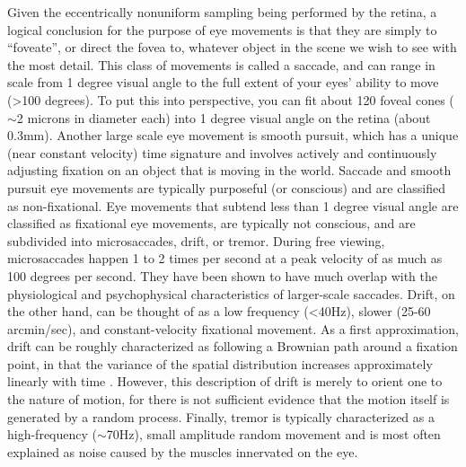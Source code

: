 Given the eccentrically nonuniform sampling being performed by the retina, a logical conclusion for the purpose of eye movements is that they are simply to ``foveate'', or direct the fovea to, whatever object in the scene we wish to see with the most detail.
This class of movements is called a saccade, and can range in scale from 1 degree visual angle to the full extent of your eyes’ ability to move (\textgreater 100 degrees).
To put this into perspective, you can fit about 120 foveal cones ($\sim$2 microns in diameter each) into 1 degree visual angle on the retina (about 0.3mm).
Another large scale eye movement is smooth pursuit, which has a unique (near constant velocity) time signature and involves actively and continuously adjusting fixation on an object that is moving in the world.
Saccade and smooth pursuit eye movements are typically purposeful (or conscious) and are classified as non-fixational.
Eye movements that subtend less than 1 degree visual angle are classified as fixational eye movements, are typically not conscious, and are subdivided into microsaccades, drift, or tremor.
During free viewing, microsaccades happen 1 to 2 times per second at a peak velocity of as much as 100 degrees per second.
They have been shown to have much overlap with the physiological and psychophysical characteristics of larger-scale saccades.
Drift, on the other hand, can be thought of as a low frequency (\textless 40Hz), slower (25-60 arcmin/sec), and constant-velocity fixational movement.
As a first approximation, drift can be roughly characterized as following a Brownian path around a fixation point, in that the variance of the spatial distribution increases approximately linearly with time \parencite{rucci2015unsteady}.
However, this description of drift is merely to orient one to the nature of motion, for there is not sufficient evidence that the motion itself is generated by a random process.
Finally, tremor is typically characterized as a high-frequency ($\sim$70Hz), small amplitude random movement and is most often explained as noise caused by the muscles innervated on the eye.

